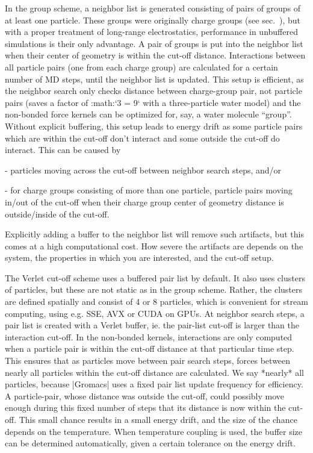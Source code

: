 In the group scheme, a neighbor list is generated consisting of pairs of
groups of at least one particle. These groups were originally charge
groups
(see sec. ), but with a proper
treatment of long-range electrostatics, performance in unbuffered
simulations is their only advantage. A pair of groups is put into the
neighbor list when their center of geometry is within the cut-off
distance. Interactions between all particle pairs (one from each charge
group) are calculated for a certain number of MD steps, until the
neighbor list is updated. This setup is efficient, as the neighbor
search only checks distance between charge-group pair, not particle
pairs (saves a factor of :math:`3  = 9` with a three-particle
water model) and the non-bonded force kernels can be optimized for, say,
a water molecule “group”. Without explicit buffering, this setup leads
to energy drift as some particle pairs which are within the cut-off
don’t interact and some outside the cut-off do interact. This can be
caused by

-  particles moving across the cut-off between neighbor search steps,
   and/or

-  for charge groups consisting of more than one particle, particle
   pairs moving in/out of the cut-off when their charge group center of
   geometry distance is outside/inside of the cut-off.

Explicitly adding a buffer to the neighbor list will remove such
artifacts, but this comes at a high computational cost. How severe the
artifacts are depends on the system, the properties in which you are
interested, and the cut-off setup.

The Verlet cut-off scheme uses a buffered pair list by default. It also
uses clusters of particles, but these are not static as in the group
scheme. Rather, the clusters are defined spatially and consist of 4 or 8
particles, which is convenient for stream computing, using e.g. SSE, AVX
or CUDA on GPUs. At neighbor search steps, a pair list is created with a
Verlet buffer, ie. the pair-list cut-off is larger than the interaction
cut-off. In the non-bonded kernels, interactions are only computed when
a particle pair is within the cut-off distance at that particular time
step. This ensures that as particles move between pair search steps,
forces between nearly all particles within the cut-off distance are
calculated. We say *nearly* all particles, because |Gromacs| uses a fixed
pair list update frequency for efficiency. A particle-pair, whose
distance was outside the cut-off, could possibly move enough during this
fixed number of steps that its distance is now within the cut-off. This
small chance results in a small energy drift, and the size of the chance
depends on the temperature. When temperature coupling is used, the
buffer size can be determined automatically, given a certain tolerance
on the energy drift.

